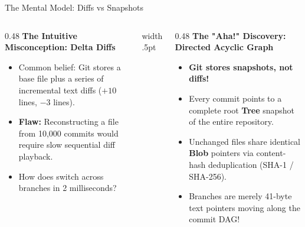 \documentclass[../m00-session-04.tex]{subfiles}
\begin{document}
\begin{frame}[fragile]{The Mental Model: Diffs vs Snapshots}
  \begin{columns}[T,onlytextwidth]
    \begin{column}{0.48\textwidth}
      {\small\bfseries\color{UpGradRed}The Intuitive Misconception: Delta Diffs}\par\vspace{0.08cm}
      \begin{itemize}\setlength{\itemsep}{0.20em}\small
        \item Common belief: Git stores a base file plus a series of incremental text diffs ($+10$ lines, $-3$ lines).
        \item \textcolor{UpGradRed}{\textbf{Flaw:}} Reconstructing a file from 10,000 commits would require slow sequential diff playback.
        \item How does  switch across branches in 2 milliseconds?
      \end{itemize}
    \end{column}
    \hfill{\color{UpGradRule}\vrule width .5pt}\hfill
    \begin{column}{0.48\textwidth}
      {\small\bfseries\color{AWSEmerald}The "Aha!" Discovery: Directed Acyclic Graph}\par\vspace{0.08cm}
      \begin{itemize}\setlength{\itemsep}{0.18em}\small
        \item \textbf{Git stores snapshots, not diffs!}
        \item Every commit points to a complete root \textbf{Tree} snapshot of the entire repository.
        \item Unchanged files share identical \textbf{Blob} pointers via content-hash deduplication (SHA-1 / SHA-256).
        \item Branches are merely 41-byte text pointers moving along the commit DAG!
      \end{itemize}
      \vspace{0.04cm}
    \end{column}
  \end{columns}
\end{frame}
\end{document}
